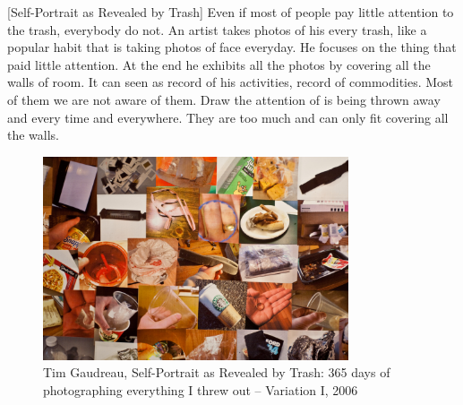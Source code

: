 %
[Self-Portrait as Revealed by Trash] Even if most of people pay little attention to the trash, everybody do not. An artist takes photos of his every trash, like a popular habit that is taking photos of face everyday. He focuses on the thing that paid little attention. At the end he exhibits all the photos by covering all the walls of room. It can seen as record of his activities, record of commodities. Most of them we are not aware of them. Draw the attention of is being thrown away and every time and everywhere. They are too much and can only fit covering all the walls.  



\begin{figure}[h!]
  \centering
  \includegraphics[height=6cm]{graphics/TimGaudreau_SelfPotraitRevealedByTrash.jpg}
  \caption{Tim Gaudreau, Self-Portrait as Revealed by Trash: 365 days of photographing everything I threw out – Variation I, 2006}
  \label{fig:TimGaudreau_SelfPotraitRevealedByTrash}
\end{figure}





